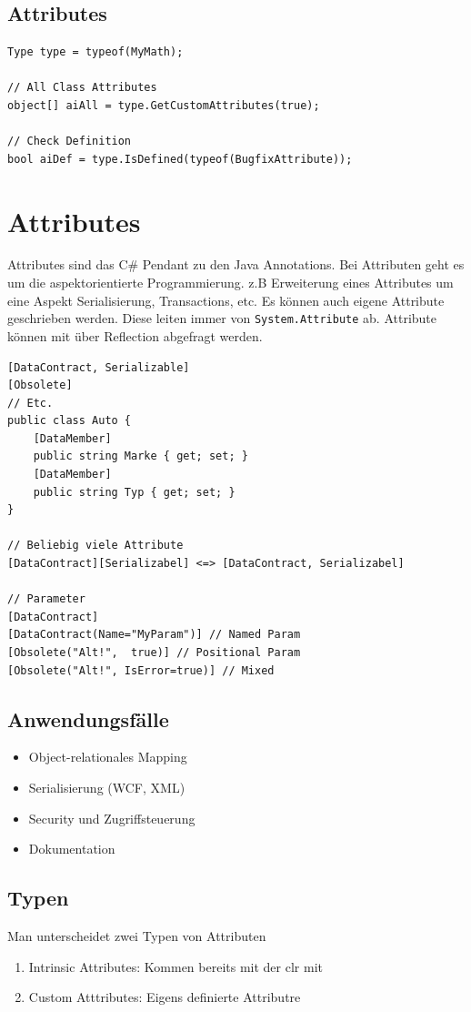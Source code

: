 \documentclass[
a4paper,
oneside,
10pt,
fleqn,
headsepline,
toc=listofnumbered, 
bibliography=totocnumbered]{scrartcl}
\let\stdsection\section
\renewcommand\section{\clearpage\stdsection}
\begin{document}
\subsection{Attributes}
\begin{lstlisting}[caption=Reflection: Attributes]
Type type = typeof(MyMath);

// All Class Attributes
object[] aiAll = type.GetCustomAttributes(true);

// Check Definition
bool aiDef = type.IsDefined(typeof(BugfixAttribute));
\end{lstlisting}

\section{Attributes}
Attributes sind das C\# Pendant zu den Java Annotations. Bei Attributen geht es um die aspektorientierte Programmierung. z.B Erweiterung eines Attributes um eine Aspekt Serialisierung, Transactions, etc. Es können auch eigene Attribute geschrieben werden. Diese leiten immer von \lstinline|System.Attribute| ab. Attribute können mit über Reflection abgefragt werden. 
\begin{lstlisting}[caption=Attributes]
[DataContract, Serializable]
[Obsolete]
// Etc.
public class Auto {
	[DataMember]
	public string Marke { get; set; }
	[DataMember]
	public string Typ { get; set; }
}

// Beliebig viele Attribute
[DataContract][Serializabel] <=> [DataContract, Serializabel]

// Parameter
[DataContract]
[DataContract(Name="MyParam")] // Named Param
[Obsolete("Alt!",  true)] // Positional Param
[Obsolete("Alt!", IsError=true)] // Mixed
\end{lstlisting}

\subsection{Anwendungsfälle}
\begin{itemize}
	\item Object-relationales Mapping
	\item Serialisierung (WCF, XML)
	\item Security und Zugriffsteuerung
	\item Dokumentation
\end{itemize}

\subsection{Typen}
Man unterscheidet zwei Typen von Attributen
\begin{enumerate}
	\item Intrinsic Attributes: Kommen bereits mit der \gls{clr} mit 
	\item Custom Atttributes: Eigens definierte Attributre
\end{enumerate}
\end{document}
